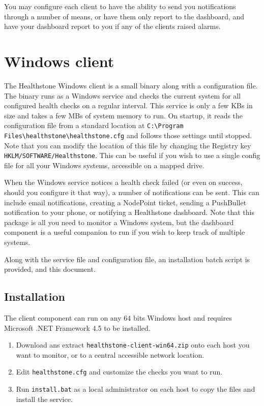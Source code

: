 \documentclass[11pt]{article}
\begin{document}
You may configure each client to have the ability to send you notifications through a number of means, or have them only report to the dashboard, and have your dashboard report to you if any of the clients raised alarms.

\section{Windows client}

The Healthstone Windows client is a small binary along with a configuration file. The binary runs as a Windows service and checks the current system for all configured health checks on a regular interval. This service is only a few KBs in size and takes a few MBs of system memory to run. On startup, it reads the configuration file from a standard location at \texttt{C:\textbackslash Program Files\textbackslash healthstone\textbackslash healthstone.cfg} and follows those settings until stopped. Note that you can modify the location of this file by changing the Registry key \texttt{HKLM/SOFTWARE/Healthstone}. This can be useful if you wish to use a single config file for all your Windows systems, accessible on a mapped drive.

When the Windows service notices a health check failed (or even on success, should you configure it that way), a number of notifications can be sent. This can include email notifications, creating a NodePoint ticket, sending a PushBullet notification to your phone, or notifying a Healthstone dashboard. Note that this package is all you need to monitor a Windows system, but the dashboard component is a useful companion to run if you wish to keep track of multiple systems.

Along with the service file and configuration file, an installation batch script is provided, and this document.

\subsection{Installation}

The client component can run on any 64 bits Windows host and requires Microsoft .NET Framework 4.5 to be installed.

\begin{enumerate}
\item Download ans extract \texttt{healthstone-client-win64.zip} onto each host you want to monitor, or to a central accessible network location.
\item Edit \texttt{healthstone.cfg} and customize the checks you want to run.
\item Run \texttt{install.bat} as a local administrator on each host to copy the files and install the service.
\end{enumerate}
\end{document}
